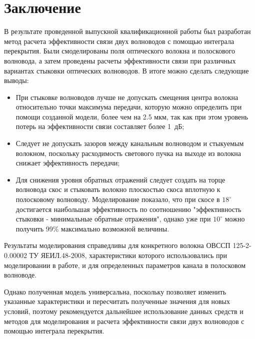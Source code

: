 \chapter*{Заключение}

В результате проведенной выпускной квалификационной работы был разработан метод расчета эффективности связи двух волноводов с помощью интеграла перекрытия. Были смоделированы поля оптического волокна и полоскового волновода, а затем проведены расчеты эффективности связи при различных вариантах стыковки оптических волноводов. В итоге можно сделать следующие выводы:

\begin{itemize}
	\item При стыковке волноводов лучше не допускать смещения центра волокна относительно точки максимума передачи, которую можно определить при помощи созданной модели, более чем на 2.5 мкм, так как при этом уровень потерь на эффективности связи составляет более 1~дБ;
	\item Следует не допускать зазоров между канальным волноводом и стыкуемым волокном, поскольку расходимость светового пучка на выходе из волокна снижает эффективность передачи;
	\item Для снижения уровня обратных отражений следует создать на торце волновода скос и стыковать волокно плоскостью скоса вплотную к полосковому волноводу. Моделирование показало, что при скосе в $18^\circ$ достигается наибольшая эффективность по соотношению "эффективность стыковки - минимальные обратные отражения", однако уже при $10^\circ$ можно получить 99\% максимально возможной величины.
\end{itemize}

Результаты моделирования справедливы для конкретного волокна ОВССП 125-2-0.00002 ТУ ЯЕИЛ.48-2008, характеристики которого использовались при моделировании в работе, и для определенных параметров канала в полосковом волноводе.

Однако полученная модель универсальна, поскольку позволяет изменить указанные характеристики и пересчитать полученные значения для новых условий, поэтому рекомендуется дальнейшее использование данных средств и методов для моделирования и расчета эффективности связи двух волноводов с помощью интеграла перекрытия.